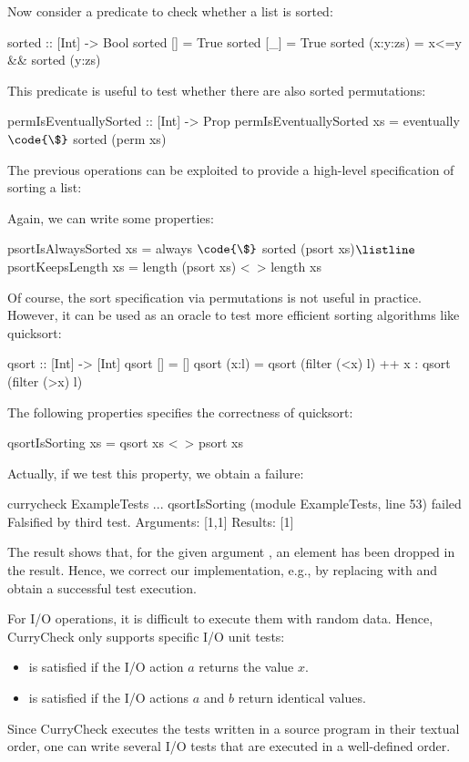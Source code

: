 Now consider a predicate to check whether a list is sorted:
\begin{curry}
sorted :: [Int] -> Bool
sorted []       = True
sorted [_]      = True
sorted (x:y:zs) = x<=y && sorted (y:zs)
\end{curry}
This predicate is useful to test whether there are also sorted permutations:
\begin{curry}
permIsEventuallySorted :: [Int] -> Prop
permIsEventuallySorted xs = eventually $\code{\$}$ sorted (perm xs)
\end{curry}
%
The previous operations can be exploited to provide
a high-level specification of sorting a list:
\begin{curry}
psort :: [Int] -> [Int}
psort xs | sorted ys = ys
 where ys = perm xs
\end{curry}
Again, we can write some properties:
\begin{curry}
psortIsAlwaysSorted xs = always $\code{\$}$ sorted (psort xs)$\listline$
psortKeepsLength xs = length (psort xs) <~> length xs
\end{curry}
Of course, the sort specification via permutations is not useful
in practice. However, it can be used as an oracle to test
more efficient sorting algorithms like quicksort:
\begin{curry}
qsort :: [Int] -> [Int] 
qsort []     = []
qsort (x:l)  = qsort (filter (<x) l) ++ x : qsort (filter (>x) l)
\end{curry}
The following properties specifies the correctness of quicksort:
\begin{curry}
qsortIsSorting xs = qsort xs <~> psort xs
\end{curry}
Actually, if we test this property, we obtain a failure:
\begin{curry}
currycheck ExampleTests
...
qsortIsSorting (module ExampleTests, line 53) failed
Falsified by third test.
Arguments:
[1,1]
Results:
[1]
\end{curry}
The result shows that, for the given argument \code{[1,1]},
an element has been dropped in the result.
Hence, we correct our implementation, e.g., by replacing
 with  and obtain a successful test execution.

For I/O operations, it is difficult to execute them with random data.
Hence, CurryCheck only supports specific I/O unit tests:
\begin{itemize}
\item {} is satisfied if the I/O action $a$
returns the value $x$.
\item {} is satisfied if the I/O actions
$a$ and $b$ return identical values.
\end{itemize}
%
Since CurryCheck executes the tests written in a source program
in their textual order, one can write several I/O tests that are
executed in a well-defined order.

